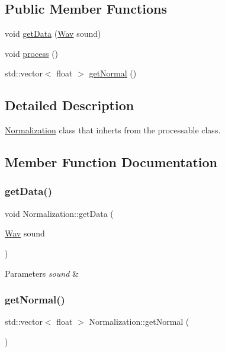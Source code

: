 \subsection*{Public Member Functions}
\begin{DoxyCompactItemize}
\item 
void \hyperlink{classNormalization_a59c6ac0b235429f48212236fdc6f6f44}{get\+Data} (\hyperlink{classWav}{Wav} sound)
\item 
void \hyperlink{classNormalization_a7666aa086ded5e86b4b5c330e49bab26}{process} ()
\item 
std\+::vector$<$ float $>$ \hyperlink{classNormalization_a17e9a95b24923be2524fd790dae5b752}{get\+Normal} ()
\end{DoxyCompactItemize}


\subsection{Detailed Description}
\hyperlink{classNormalization}{Normalization} class that inherts from the processable class. 

\subsection{Member Function Documentation}
\mbox{\label{classNormalization_a59c6ac0b235429f48212236fdc6f6f44}} 
\subsubsection{\texorpdfstring{get\+Data()}{getData()}}
{\footnotesize\ttfamily void Normalization\+::get\+Data (\begin{DoxyParamCaption}\item[{\hyperlink{classWav}{Wav}}]{sound }\end{DoxyParamCaption})}


\begin{DoxyParams}{Parameters}
{\em sound} & \\
\hline
\end{DoxyParams}
\mbox{\label{classNormalization_a17e9a95b24923be2524fd790dae5b752}} 
\subsubsection{\texorpdfstring{get\+Normal()}{getNormal()}}
{\footnotesize\ttfamily std\+::vector$<$ float $>$ Normalization\+::get\+Normal (\begin{DoxyParamCaption}{ }\end{DoxyParamCaption})}

